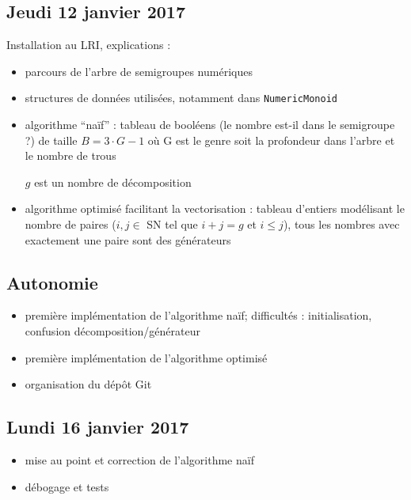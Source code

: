 \documentclass[12pt,a4paper]{report}
\let\leq\leqslant
\begin{document}
\subsection*{Jeudi 12 janvier 2017}
Installation au LRI, explications :
\begin{itemize}
	\item	parcours de l'arbre de semigroupes numériques

	\item	structures de données utilisées, notamment dans \texttt{NumericMonoid}

	\item	algorithme ``naïf'' : tableau de booléens (le nombre est-il dans le semigroupe ?) de taille $B = 3 \cdot G - 1$ où G est le genre soit la profondeur dans l'arbre et le nombre de trous
			\begin{algorithmic}
								\STATE $g$ est un nombre de décomposition
							\ENDIF
						\ENDFOR
					\ENDIF
				\ENDFOR
			\end{algorithmic}

	\item	algorithme optimisé facilitant la vectorisation : tableau d'entiers modélisant le nom\-bre de paires ($i, j \in$ SN tel que $i + j = g$ et $i \leq j$), tous les nombres avec exactement une paire sont des générateurs
\end{itemize}

\subsection*{Autonomie}
\begin{itemize}
	\item	première implémentation de l'algorithme naïf; difficultés : initialisation, confusion décomposition/générateur
	\item	première implémentation de l'algorithme optimisé
	\item	organisation du dépôt Git
\end{itemize}

\subsection*{Lundi 16 janvier 2017}
\begin{itemize}
	\item	mise au point et correction de l'algorithme naïf
	\item	débogage et tests
\end{itemize}
\end{document}
